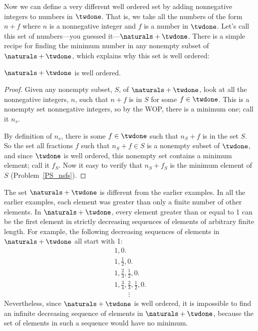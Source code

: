 Now we can define a very different well ordered set by adding
nonnegative integers to numbers in $\twdone$.  That is, we take all
the numbers of the form $n + f$ where $n$ is a nonnegative integer and
$f$ is a number in $\twdone$.  Let's call this set of numbers---you
guessed it---$\naturals + \twdone$.  There is a simple recipe for
finding the minimum number in any nonempty subset of $\naturals +
\twdone$, which explains why this set is well ordered:

\begin{lemma}\label{to1_well-order}
$\naturals + \twdone$ is well ordered.
\end{lemma}

\begin{proof}
Given any nonempty subset, $S$, of $\naturals + \twdone$, look at all
the nonnegative integers, $n$, such that $n+f$ is in $S$ for some $f
\in \twdone$.  This is a nonempty set nonnegative integers, so by the
WOP, there is a minimum one; call it $n_s$.

By definition of $n_s$, there is some $f \in \twdone$ such that
$n_S+f$ is in the set $S$.  So the set all fractions $f$ such that
$n_S+f \in S$ is a nonempty subset of $\twdone$, and since $\twdone$ is
well ordered, this nonempty set contains a minimum element; call it
$f_S$.  Now it easy to verify that $n_S+f_S$ is
the minimum element of $S$ (Problem~\ref{PS_nsfs}).
\end{proof}

The set $\naturals + \twdone$ is different from the earlier examples.
In all the earlier examples, each element was greater than
only a finite number of other elements.  In $\naturals + \twdone$, every
element greater than or equal to 1 can be the first element in
strictly decreasing sequences of elements of arbitrary finite length.
For example, the following decreasing sequences of elements in
$\naturals + \twdone$ all start with 1:
\[\begin{array}{l}
1, 0.\\
1, \frac12, 0.\\
1, \frac23, \frac12, 0.\\
1,  \frac34, \frac23, \frac12, 0.\\
\qquad\vdots
\end{array}\]
Nevertheless, since $\naturals + \twdone$ is well ordered, it is
impossible to find an infinite decreasing sequence of elements in
$\naturals + \twdone$, because the set of elements in such a sequence
would have no minimum.

\begin{problems}
\homeworkproblems
{}

\practiceproblems
{}

\classproblems
{}

\end{problems}
\endinput


